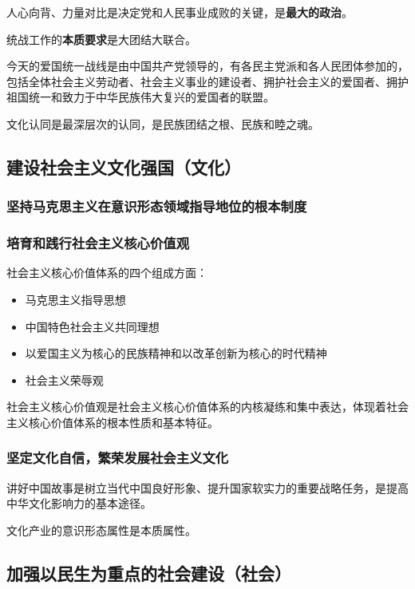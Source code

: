 \documentclass[12pt, a4paper, oneside]{ctexart}
\begin{document}
人心向背、力量对比是决定党和人民事业成败的关键，是\textbf{最大的政治}。

统战工作的\textbf{本质要求}是大团结大联合。

今天的爱国统一战线是由中国共产党领导的，有各民主党派和各人民团体参加的，包括全体社会主义劳动者、社会主义事业的建设者、拥护社会主义的爱国者、拥护祖国统一和致力于中华民族伟大复兴的爱国者的联盟。

文化认同是最深层次的认同，是民族团结之根、民族和睦之魂。

\subsection{建设社会主义文化强国（文化）}

\subsubsection{坚持马克思主义在意识形态领域指导地位的根本制度}

\subsubsection{培育和践行社会主义核心价值观}

社会主义核心价值体系的四个组成方面：
\begin{itemize}
  \item 马克思主义指导思想
  \item 中国特色社会主义共同理想
  \item 以爱国主义为核心的民族精神和以改革创新为核心的时代精神
  \item 社会主义荣辱观
\end{itemize}

社会主义核心价值观是社会主义核心价值体系的内核凝练和集中表达，体现着社会主义核心价值体系的根本性质和基本特征。

\subsubsection{坚定文化自信，繁荣发展社会主义文化}

讲好中国故事是树立当代中国良好形象、提升国家软实力的重要战略任务，是提高中华文化影响力的基本途径。

文化产业的意识形态属性是本质属性。

\subsection{加强以民生为重点的社会建设（社会）}
\end{document}
